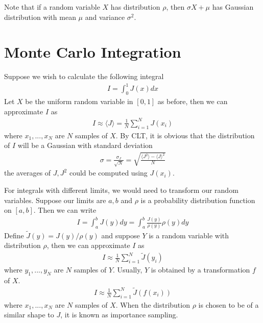 \documentclass{article}
\begin{document}
Note that if a random variable $X$ has distribution $\rho$, then $\sigma X + \mu$ has Gaussian distribution with mean $\mu$ and variance $\sigma^2$.

\section{Monte Carlo Integration}

Suppose we wish to calculate the following integral
\begin{align*}
    I = \int_0^1 J(x) dx
\end{align*}
Let $X$ be the uniform random variable in $[0, 1]$ as before, then we can approximate $I$ as
\begin{align*}
    I \approx \langle J \rangle = \frac{1}{N} \sum_{i=1}^N J(x_i)
\end{align*}
where $x_1, ..., x_N$ are $N$ samples of $X$.
By CLT, it is obvious that the distribution of $I$ will be a Gaussian with standard deviation
\begin{align*}
    \sigma = \frac{\sigma_J}{\sqrt{N}} = \sqrt{\frac{\langle J^2 \rangle - \langle J \rangle^2}{N}}
\end{align*}
the averages of $J, J^2$ could be computed using $J(x_i)$.

For integrals with different limits, we would need to transform our random variables. Suppose our limits are $a, b$ and $\rho$ is a probability distribution function on $[a, b]$.
Then we can write
\begin{align*}
    I = \int_a^b J(y) dy = \int_a^b \frac{J(y)}{\rho(y)} \rho(y) dy
\end{align*}
Define $\tilde{J}(y) = J(y) / \rho(y)$ and suppose $Y$ is a random variable with distribution $\rho$, then we can approximate $I$ as
\begin{align*}
    I \approx \frac{1}{N} \sum_{i=1}^N \tilde{J}(y_i)
\end{align*}
where $y_1, ..., y_N$ are $N$ samples of $Y$.
Usually, $Y$ is obtained by a transformation $f$ of $X$.
\begin{align*}
    I \approx \frac{1}{N} \sum_{i=1}^N \tilde{J}(f(x_i))
\end{align*}
where $x_1, ..., x_N$ are $N$ samples of $X$. When the distribution $\rho$ is chosen to be of a similar shape to $J$,
it is known as importance sampling.
\end{document}
